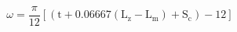 \documentclass[12pt]{article}
\begin{document}
\begin{displaymath}
\omega=\frac{\pi}{12}\left[\left(\mathrm{t}+0.06667\left(\mathrm{L}_{\mathrm{z}}-\mathrm{L}_{\mathrm{m}}\right)+\mathrm{S}_{\mathrm{c}}\right)-12\right]
\end{displaymath}
\end{document}
